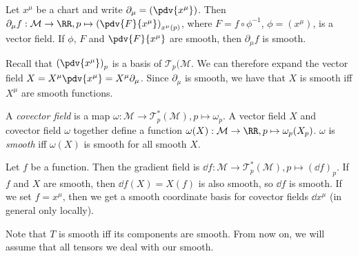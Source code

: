 \documentclass{jknotes}
\begin{document}
\begin{eg}
    Let \(x^\mu\) be a chart and write \(\partial_\mu = \left(\pdv{x^\mu}\right)\). Then \(\partial_\mu f : \mathcal{M}\to\RR, p\mapsto \left(\pdv{F}{x^\mu}\right)_{x^\mu(p)}\), where \(F = f\circ\phi^{-1}\), \(\phi = (x^\mu)\), is a vector field. If \(\phi\), \(F\) and \(\pdv{F}{x^\mu}\) are smooth, then \(\partial_\mu f\) is smooth.
\end{eg}
Recall that \(\left(\pdv{x^\mu}\right)_p\) is a basis of \(\mathcal{T}_p(\mathcal{M}\). We can therefore expand the vector field \(X=X^\mu\pdv{x^\mu}=X^\mu\partial_\mu\). Since \(\partial_\mu\) is smooth, we have that \(X\) is smooth iff \(X^\mu\) are smooth functions.
\begin{defn}
    A \emph{covector field} is a map \(\omega:\mathcal{M}\to\mathcal{T}_p^*(\mathcal{M}),p\mapsto\omega_p\). A vector field \(X\) and covector field \(\omega\) together define a function \(\omega(X):\mathcal{M}\to\RR, p\mapsto\omega_p(X_p)\). \(\omega\) is \emph{smooth} iff \(\omega(X)\) is smooth for all smooth \(X\).
\end{defn}

\begin{eg}
    Let \(f\) be a function. Then the gradient field is \(\dd{f}:\mathcal{M}\to\mathcal{T}_p^*(\mathcal{M}),p\mapsto(\dd{f})_p\). If \(f\) and \(X\) are smooth, then \(\dd{f}(X)=X(f)\) is also smooth, so \(\dd{f}\) is smooth. If we set \(f=x^\mu\), then we get a smooth coordinate basis for covector fields \(\dd{x^\mu}\) (in general only locally).
\end{eg}

Note that \(T\) is smooth iff its components are smooth. From now on, we will assume that all tensors we deal with our smooth.
\end{document}
